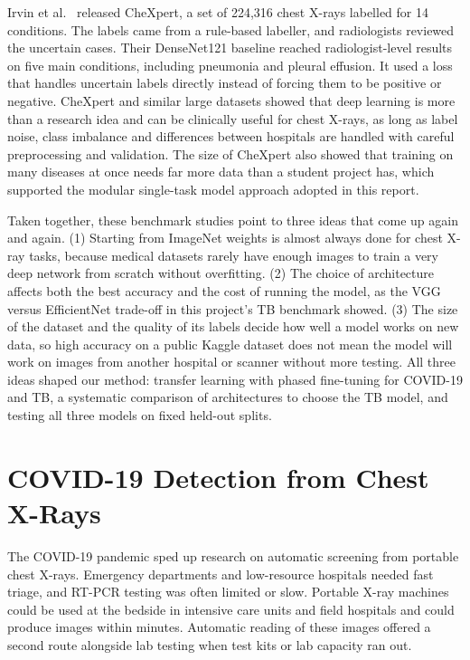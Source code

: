 Irvin et al.~\cite{irvin2019} released CheXpert, a set of 224,316 chest X-rays labelled for 14 conditions. The labels came from a rule-based labeller, and radiologists reviewed the uncertain cases. Their DenseNet121 baseline reached radiologist-level results on five main conditions, including pneumonia and pleural effusion. It used a loss that handles uncertain labels directly instead of forcing them to be positive or negative. CheXpert and similar large datasets showed that deep learning is more than a research idea and can be clinically useful for chest X-rays, as long as label noise, class imbalance and differences between hospitals are handled with careful preprocessing and validation. The size of CheXpert also showed that training on many diseases at once needs far more data than a student project has, which supported the modular single-task model approach adopted in this report.

Taken together, these benchmark studies point to three ideas that come up again and again. (1) Starting from ImageNet weights is almost always done for chest X-ray tasks, because medical datasets rarely have enough images to train a very deep network from scratch without overfitting. (2) The choice of architecture affects both the best accuracy and the cost of running the model, as the VGG versus EfficientNet trade-off in this project's TB benchmark showed. (3) The size of the dataset and the quality of its labels decide how well a model works on new data, so high accuracy on a public Kaggle dataset does not mean the model will work on images from another hospital or scanner without more testing. All three ideas shaped our method: transfer learning with phased fine-tuning for COVID-19 and TB, a systematic comparison of architectures to choose the TB model, and testing all three models on fixed held-out splits.

\section{COVID-19 Detection from Chest X-Rays}

The COVID-19 pandemic sped up research on automatic screening from portable chest X-rays. Emergency departments and low-resource hospitals needed fast triage, and RT-PCR testing was often limited or slow. Portable X-ray machines could be used at the bedside in intensive care units and field hospitals and could produce images within minutes. Automatic reading of these images offered a second route alongside lab testing when test kits or lab capacity ran out.

